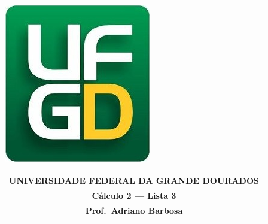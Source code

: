 \documentclass[a4paper,5pt]{amsbook}
\begin{document}
\thispagestyle{empty}
\pagestyle{empty}
\begin{minipage}[h]{0.14\textwidth}
	\includegraphics[scale=0.24]{../../ufgd.png}
\end{minipage}
\begin{minipage}[h]{\textwidth}
\begin{tabular}{c}
{{\bf UNIVERSIDADE FEDERAL DA GRANDE DOURADOS}}\\
{{\bf C\'alculo 2 --- Lista 3}}\\
{{\bf Prof.\ Adriano Barbosa}}\\
\end{tabular}
\vspace{-0.45cm}
%
\end{minipage}

\end{document}
